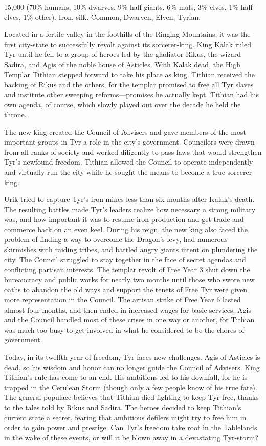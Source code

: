 {15,000 (70\% humans, 10\% dwarves, 9\% half-giants, 6\% muls, 3\% elves, 1\% half-elves, 1\% other).}
{Iron, silk.}
{Common, Dwarven, Elven, Tyrian.}
{

	Located in a fertile valley in the foothills of the Ringing Mountains, it was the first city-state to successfully revolt against its sorcerer-king. King Kalak ruled Tyr until he fell to a group of heroes led by the gladiator Rikus, the wizard Sadira, and Agis of the noble house of Asticles. With Kalak dead, the High Templar Tithian stepped forward to take his place as king. Tithian received the backing of Rikus and the others, for the templar promised to free all Tyr slaves and institute other sweeping reforms---promises he actually kept. Tithian had his own agenda, of course, which slowly played out over the decade he held the throne.

	The new king created the Council of Advisers and gave members of the most important groups in Tyr a role in the city's government. Councilors were drawn from all ranks of society and worked diligently to pass laws that would strengthen Tyr's newfound freedom. Tithian allowed the Council to operate independently and virtually run the city while he sought the means to become a true sorcerer-king.

	Urik tried to capture Tyr's iron mines less than six months after Kalak's death. The resulting battles made Tyr's leaders realize how necessary a strong military was, and how important it was to resume iron production and get trade and commerce back on an even keel. During his reign, the new king also faced the problem of finding a way to overcome the Dragon's levy, had numerous skirmishes with raiding tribes, and battled angry giants intent on plundering the city. The Council struggled to stay together in the face of secret agendas and conflicting partisan interests. The templar revolt of Free Year 3 shut down the bureaucracy and public works for nearly two months until those who swore new oaths to abandon the old ways and support the tenets of Free Tyr were given more representation in the Council. The artisan strike of Free Year 6 lasted almost four months, and then ended in increased wages for basic services. Agis and the Council handled most of these crises in one way or another, for Tithian was much too busy to get involved in what he considered to be the chores of government.

	Today, in its twelfth year of freedom, Tyr faces new challenges. Agis of Asticles is dead, so his wisdom and honor can no longer guide the Council of Advisers. King Tithian's rule has come to an end. His ambitions led to his downfall, for he is trapped in the Cerulean Storm (though only a few people know of his true fate). The general populace believes that Tithian died fighting to keep Tyr free, thanks to the tales told by Rikus and Sadira. The heroes decided to keep Tithian's current state a secret, fearing that ambitious defilers might try to free him in order to gain power and prestige. Can Tyr's freedom take root in the Tablelands in the wake of these events, or will it be blown away in a devastating Tyr-storm?

}
